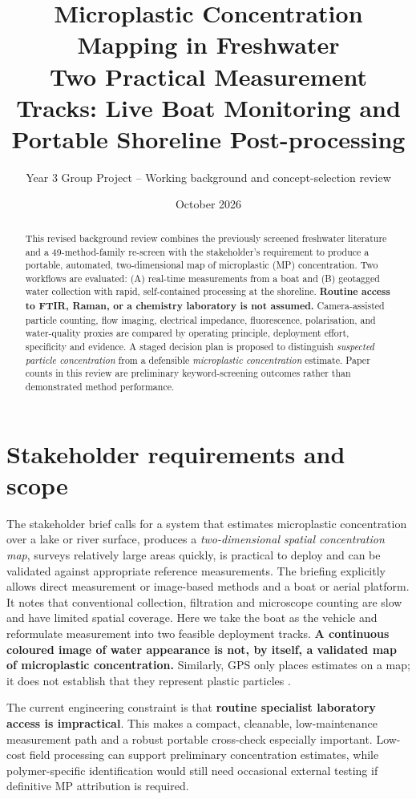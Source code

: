 \documentclass[10pt,a4paper]{article}
\title{\color{mpblue}\bfseries Microplastic Concentration Mapping in Freshwater\\[4pt]
\large Two Practical Measurement Tracks: Live Boat Monitoring and Portable Shoreline Post-processing}
\author{Year 3 Group Project -- Working background and concept-selection review}
\date{October 2026}
\begin{document}
\maketitle
\begin{abstract}
This revised background review combines the previously screened freshwater literature and a 49-method-family re-screen with the stakeholder's requirement to produce a portable, automated, two-dimensional map of microplastic (MP) concentration. Two workflows are evaluated: (A) real-time measurements from a boat and (B) geotagged water collection with rapid, self-contained processing at the shoreline. \textbf{Routine access to FTIR, Raman, or a chemistry laboratory is not assumed.} Camera-assisted particle counting, flow imaging, electrical impedance, fluorescence, polarisation, and water-quality proxies are compared by operating principle, deployment effort, specificity and evidence. A staged decision plan is proposed to distinguish \emph{suspected particle concentration} from a defensible \emph{microplastic concentration} estimate. Paper counts in this review are preliminary keyword-screening outcomes rather than demonstrated method performance.
\end{abstract}

\section{Stakeholder requirements and scope}
The stakeholder brief calls for a system that estimates microplastic concentration over a lake or river surface, produces a \emph{two-dimensional spatial concentration map}, surveys relatively large areas quickly, is practical to deploy and can be validated against appropriate reference measurements. The briefing explicitly allows direct measurement or image-based methods and a boat or aerial platform. It notes that conventional collection, filtration and microscope counting are slow and have limited spatial coverage. Here we take the boat as the vehicle and reformulate measurement into two feasible deployment tracks. \textbf{A continuous coloured image of water appearance is not, by itself, a validated map of microplastic concentration.} Similarly, GPS only places estimates on a map; it does not establish that they represent plastic particles \cite{Chen2021,Chen2023,Blevins2021}.

The current engineering constraint is that \textbf{routine specialist laboratory access is impractical}. This makes a compact, cleanable, low-maintenance measurement path and a robust portable cross-check especially important. Low-cost field processing can support preliminary concentration estimates, while polymer-specific identification would still need occasional external testing if definitive MP attribution is required.
\end{document}
